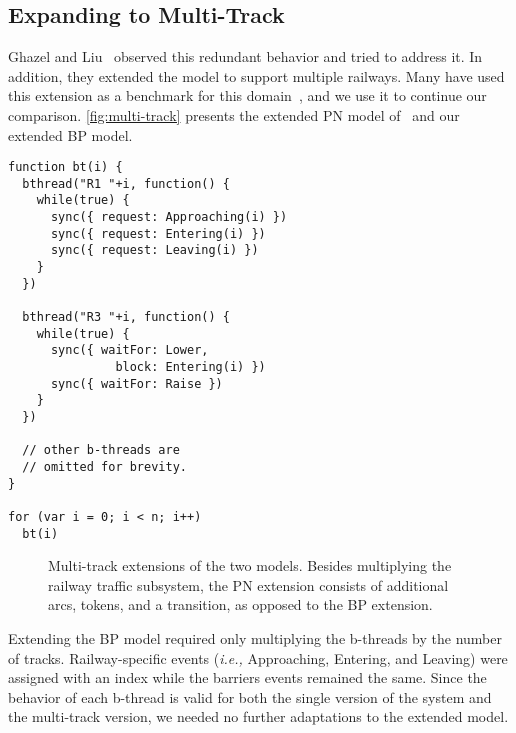 \documentclass[10pt,journal,compsoc]{IEEEtran}
\theoremstyle{definition}
\newcommand{\ie}{\emph{i.e.,}\xspace}
\begin{document}
\subsection{Expanding to Multi-Track}
\label{sec:multi-track}
Ghazel and Liu~\cite{ghazel2016customizable} observed this redundant behavior and tried to address it. In addition, they extended the model to support multiple railways. Many have used this extension as a benchmark for this domain~\cite{boussif2016contributions, boussif2017experimental, liu2018time}, and we use it to continue our comparison. \autoref{fig:multi-track} presents the extended PN model of~\cite{ghazel2016customizable} and our extended BP model. 

\newsavebox{\tempbox}
\newbox{\mybox}
\begin{lrbox}{\mybox}
\begin{lstlisting}[linewidth=7cm,numbers=none]
function bt(i) {
  bthread("R1 "+i, function() {
    while(true) {
      sync({ request: Approaching(i) })
      sync({ request: Entering(i) })
      sync({ request: Leaving(i) })
    }
  })

  bthread("R3 "+i, function() {
    while(true) {
      sync({ waitFor: Lower, 
               block: Entering(i) })
      sync({ waitFor: Raise })
    }
  })

  // other b-threads are 
  // omitted for brevity. 
}

for (var i = 0; i < n; i++) 
  bt(i)
\end{lstlisting}
\end{lrbox}

\begin{figure*}[tbph]
    \centering
    \qquad\qquad\qquad
    \caption{Multi-track extensions of the two models. Besides multiplying the railway traffic subsystem, the PN extension consists of additional arcs, tokens, and a transition, as opposed to the BP extension.}
    \label{fig:multi-track}
\end{figure*}

Extending the BP model required only multiplying the b-threads by the number of tracks. Railway-specific events (\ie Approaching, Entering, and Leaving) were assigned with an index while the barriers events remained the same. Since the behavior of each b-thread is valid for both the single version of the system and the multi-track version, we needed no further adaptations to the extended model.
\end{document}

